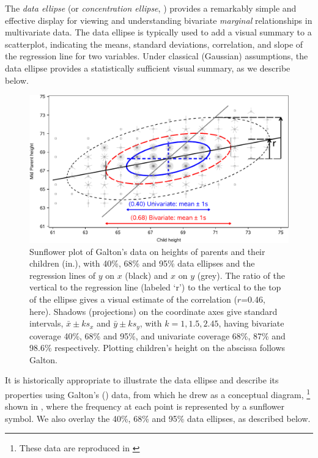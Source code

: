 
The \emph{data ellipse} \citep{Monette:90} (or \emph{concentration ellipse}, \citealp[Ch. 7]{Dempster:69})
provides a remarkably
simple and effective display for viewing and understanding
bivariate \emph{marginal} relationships in multivariate data.
The data ellipse is typically used to add a visual summary to a scatterplot,
indicating the means, standard deviations, correlation,
and slope of the regression line for
two variables. Under classical (Gaussian) assumptions, the data ellipse
provides a statistically sufficient visual summary, as we describe below.


\begin{figure}[htb]
  \centering
  \includegraphics[width=.9\textwidth,clip]{fig/galton-reg3}
  \caption{Sunflower plot of Galton's data on heights of parents and their children (in.), with
  40\%, 68\% and 95\% data ellipses and the regression lines of $y$ on $x$ (black) and
  $x$ on $y$ (grey). The ratio of the vertical to the regression line (labeled `r') to the vertical
  to the top of the ellipse gives a visual estimate of the correlation ($r$=0.46, here).
  Shadows (projections) on the coordinate axes give standard intervals, 
  $\bar{x} \pm k s_x$ and $\bar{y} \pm k s_y$, 
  with $k=1, 1.5, 2.45$, having
  bivariate coverage 40\%, 68\% and 95\%, and univariate coverage 68\%, 87\% and 98.6\% respectively.
  Plotting children's height on the abscissa follows Galton.
  }%
  \label{fig:galton-reg3}
\end{figure}

It is historically appropriate to illustrate the data ellipse and
describe its properties using Galton's (\citeyear[Table
I]{Galton:1886})
data, from which he drew  as a conceptual
diagram,%
\footnote{These data are reproduced in \citet[Table 8.2, p.
286]{Stigler:1986}}
shown in , where the frequency at
each point is represented by a sunflower symbol. We also overlay the 40\%,
68\% and 95\% data ellipses, as described below.

